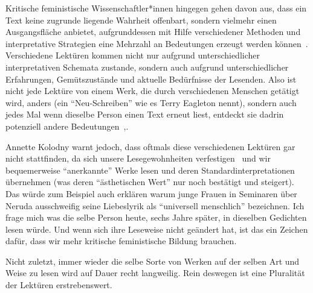 Kritische feministische Wissenschaftler*innen hingegen gehen davon aus, dass ein Text keine zugrunde liegende Wahrheit offenbart, sondern vielmehr einen Ausgangsfläche anbietet, aufgrunddessen mit Hilfe verschiedener Methoden und interpretative Strategien eine Mehrzahl an Bedeutungen erzeugt werden können~\cite{Beehler1988}.
Verschiedene Lektüren kommen nicht nur aufgrund unterschiedlicher interpretativen Schemata zustande, sondern auch aufgrund unterschiedlicher Erfahrungen, Gemütszustände und aktuelle Bedürfnisse der Lesenden.
Also ist nicht jede Lektüre von einem Werk, die durch verschiedenen Menschen getätigt wird, anders (ein ``Neu-Schreiben'' wie es Terry Eagleton nennt), sondern auch jedes Mal wenn dieselbe Person einen Text erneut liest, entdeckt sie dadrin potenziell andere Bedeutungen~\cite{Eagleton1997},\cite{Kolodny1980}.

Annette Kolodny warnt jedoch, dass oftmals diese verschiedenen Lektüren gar nicht stattfinden, da sich unsere Lesegewohnheiten verfestigen~\cite{Kolodny1980} und wir bequemerweise ``anerkannte'' Werke lesen und deren Standardinterpretationen übernehmen (was deren ``ästhetischen Wert'' nur noch bestätigt und steigert).
Das würde zum Beispiel auch erklären warum junge Frauen in Seminaren über Neruda ausschweifig seine Liebeslyrik als ``universell menschlich'' bezeichnen.
Ich frage mich was die selbe Person heute, sechs Jahre später, in dieselben Gedichten lesen würde.
Und wenn sich ihre Leseweise nicht geändert hat, ist das ein Zeichen dafür, dass wir mehr kritische feministische Bildung brauchen.

Nicht zuletzt, immer wieder die selbe Sorte von Werken auf der selben Art und Weise zu lesen wird auf Dauer recht langweilig.
Rein deswegen ist eine Pluralität der Lektüren erstrebenswert.

